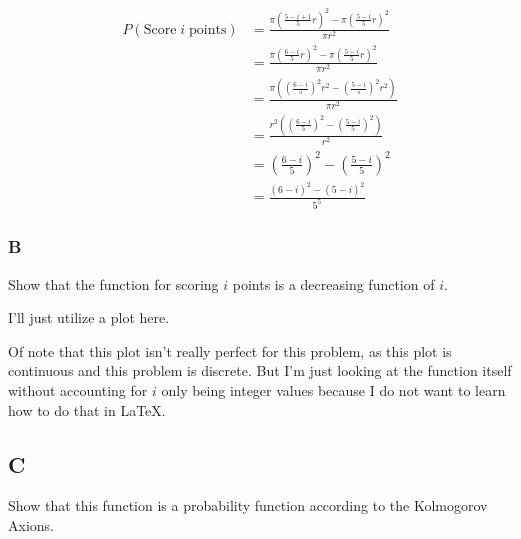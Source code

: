 \begin{align*}
	P(\text{Score}\; i\; \text{points}) &= \frac{\pi \left( \frac{5 - i + 1}{5} r \right)^2 - \pi \left( \frac{5 - i}{5} r \right)^2 }{\pi r^2} \\
	&= \frac{\pi \left( \frac{6 - i}{5} r \right)^2 - \pi \left( \frac{5 - i}{5} r \right)^2 }{\pi r^2} \\
	&= \frac{\pi \left( \left( \frac{6 - i}{5}\right)^2 r^2 - \left(\frac{5 - i}{5}\right)^2 r^2 \right) }{\pi r^2} \\
	&= \frac{r^2 \left( \left( \frac{6 - i}{5}\right)^2 - \left(\frac{5 - i}{5}\right)^2 \right) }{r^2} \\
	&= \left( \frac{6 - i}{5}\right)^2 - \left(\frac{5 - i}{5}\right)^2 \\
	&= \frac{(6-i)^2 - (5-i)^2}{5^5}
\end{align*}


\subsubsection*{B} 

Show that the function for scoring $i$ points is a decreasing function of $i$.

I'll just utilize a plot here.


Of note that this plot isn't really perfect for this problem, as this plot is continuous and this problem is discrete. But I'm just looking at the function itself without accounting for $i$ only being integer values because I do not want to learn how to do that in \LaTeX .

\pagebreak


\subsection*{C}

Show that this function is a probability function according to the Kolmogorov Axions.

